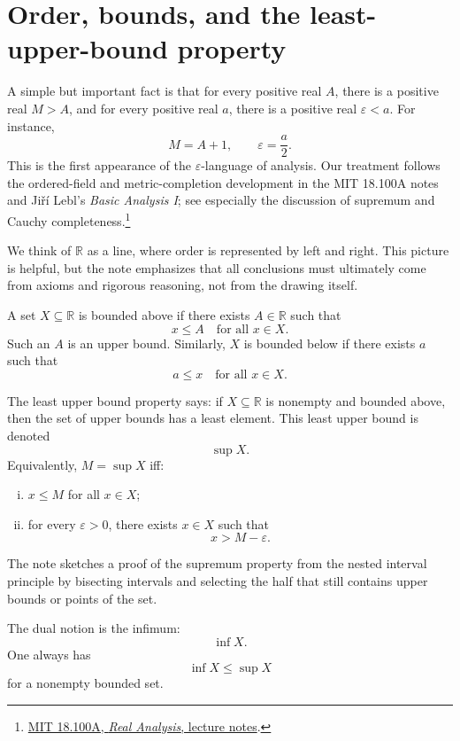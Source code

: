 
\section{Order, bounds, and the least-upper-bound property}

A simple but important fact is that for every positive real \(A\), there is a positive real \(M>A\), and for every positive real \(a\), there is a positive real \(\varepsilon<a\).  For instance,
\[
  M=A+1,\qquad \varepsilon=\frac a2.
\]
This is the first appearance of the \(\varepsilon\)-language of analysis. Our treatment follows the ordered-field and metric-completion development in the MIT 18.100A notes and Jiří Lebl's \emph{Basic Analysis I}; see especially the discussion of supremum and Cauchy completeness.\footnote{\href{https://ocw.mit.edu/courses/18-100a-real-analysis-fall-2020/pages/lecture-notes-and-readings/}{MIT 18.100A, \emph{Real Analysis}, lecture notes}.}

We think of \(\mathbb R\) as a line, where order is represented by left and right.  This picture is helpful, but the note emphasizes that all conclusions must ultimately come from axioms and rigorous reasoning, not from the drawing itself.

A set \(X\subseteq\mathbb R\) is bounded above if there exists \(A\in\mathbb R\) such that
\[
  x\le A\quad\text{for all }x\in X.
\]
Such an \(A\) is an upper bound.  Similarly, \(X\) is bounded below if there exists \(a\) such that
\[
  a\le x\quad\text{for all }x\in X.
\]

The least upper bound property says: if \(X\subseteq\mathbb R\) is nonempty and bounded above, then the set of upper bounds has a least element.  This least upper bound is denoted
\[
  \sup X.
\]
Equivalently, \(M=\sup X\) iff:
\begin{enumerate}[(i)]
  \item \(x\le M\) for all \(x\in X\);
  \item for every \(\varepsilon>0\), there exists \(x\in X\) such that
  \[
    x>M-\varepsilon.
  \]
\end{enumerate}
The note sketches a proof of the supremum property from the nested interval principle by bisecting intervals and selecting the half that still contains upper bounds or points of the set.

The dual notion is the infimum:
\[
  \inf X.
\]
One always has
\[
  \inf X\le \sup X
\]
for a nonempty bounded set.

